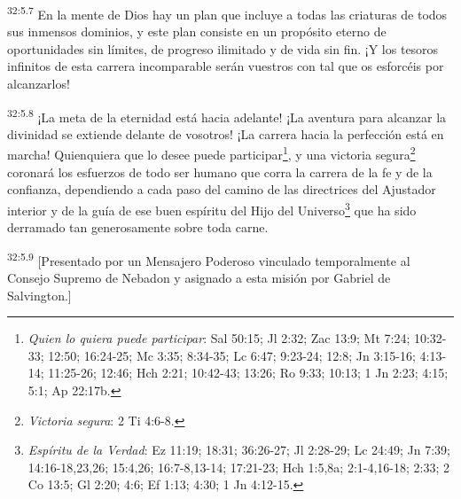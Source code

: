 \par
\textsuperscript{32:5.7} En la mente de Dios hay un plan que incluye a todas las criaturas de todos sus inmensos dominios, y este plan consiste en un propósito eterno de oportunidades sin límites, de progreso ilimitado y de vida sin fin. ¡Y los tesoros infinitos de esta carrera incomparable serán vuestros con tal que os esforcéis por alcanzarlos!

\par
\textsuperscript{32:5.8} ¡La meta de la eternidad está hacia adelante! ¡La aventura para alcanzar la divinidad se extiende delante de vosotros! ¡La carrera hacia la perfección está en marcha! Quienquiera que lo desee puede participar\footnote{\textit{Quien lo quiera puede participar}: Sal 50:15; Jl 2:32; Zac 13:9; Mt 7:24; 10:32-33; 12:50; 16:24-25; Mc 3:35; 8:34-35; Lc 6:47; 9:23-24; 12:8; Jn 3:15-16; 4:13-14; 11:25-26; 12:46; Hch 2:21; 10:42-43; 13:26; Ro 9:33; 10:13; 1 Jn 2:23; 4:15; 5:1; Ap 22:17b.}, y una victoria segura\footnote{\textit{Victoria segura}: 2 Ti 4:6-8.} coronará los esfuerzos de todo ser humano que corra la carrera de la fe y de la confianza, dependiendo a cada paso del camino de las directrices del Ajustador interior y de la guía de ese buen espíritu del Hijo del Universo\footnote{\textit{Espíritu de la Verdad}: Ez 11:19; 18:31; 36:26-27; Jl 2:28-29; Lc 24:49; Jn 7:39; 14:16-18,23,26; 15:4,26; 16:7-8,13-14; 17:21-23; Hch 1:5,8a; 2:1-4,16-18; 2:33; 2 Co 13:5; Gl 2:20; 4:6; Ef 1:13; 4:30; 1 Jn 4:12-15.} que ha sido derramado tan generosamente sobre toda carne.

\par
\textsuperscript{32:5.9} [Presentado por un Mensajero Poderoso vinculado temporalmente al Consejo Supremo de Nebadon y asignado a esta misión por Gabriel de Salvington.]